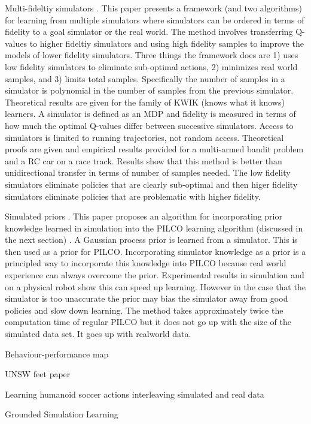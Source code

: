 \documentclass[12 pt]{article}
\begin{document}
Multi-fideltiy simulators \cite{cutler2014reinforcement}.
This paper presents a framework (and two algorithms) for learning from multiple simulators where simulators can be ordered in terms of fidelity to a goal simulator or the real world. The method involves transferring Q-values to higher fideltiy simulators and using high fidelity samples to improve the models of lower fidelity simulators. Three things the framework does are 1) uses low fidelity simulators to eliminate sub-optimal actions, 2) minimizes real world samples, and 3) limits total samples. Specifically the number of samples in a simulator is polynomial in the number of samples from the previous simulator. Theoretical results are given for the family of KWIK (knows what it knows) learners. A simulator is defined as an MDP and fidelity is measured in terms of how much the optimal Q-values differ between successive simulators. Access to simulators is limited to running trajectories, not random access. Theoretical proofs are given and empirical results provided for a multi-armed bandit problem and a RC car on a race track. Results show that this method is better than unidirectional transfer in terms of number of samples needed. The low fidelity simulators eliminate policies that are clearly sub-optimal and then higer fidelity simulators eliminate policies that are problematic with higher fidelity.


Simulated priors \cite{cutler2015efficient}.
This paper proposes an algorithm for incorporating prior knowledge learned in simulation into the PILCO learning algorithm (discussed in the next section) \cite{deisenroth2011pilco}. A Gaussian process prior is learned from a simulator. This is then used as a prior for PILCO. Incorporating simulator knowledge as a prior is a principled way to incorporate this knowledge into PILCO because real world experience can always overcome the prior. Experimental results in simulation and on a physical robot show this can speed up learning. However in the case that the simulator is too unaccurate the prior may bias the simulator away from good policies and slow down learning. The method takes approximately twice the computation time of regular PILCO but it does not go up with the size of the simulated data set. It goes up with realworld data.

Behaviour-performance map

UNSW feet paper

Learning humanoid soccer actions interleaving simulated and real data

Grounded Simulation Learning \cite{farchy2013humanoid}
\end{document}

